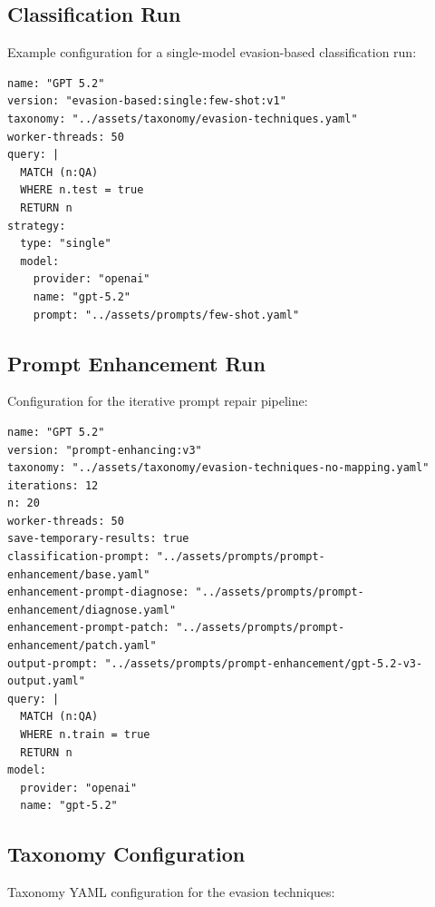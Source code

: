 \documentclass[11pt]{article}
\begin{document}
\subsection{Classification Run}
\label{sec:appendix-classification-config}

Example configuration for a single-model evasion-based classification run:

\begin{lstlisting}[style=yaml]
name: "GPT 5.2"
version: "evasion-based:single:few-shot:v1"
taxonomy: "../assets/taxonomy/evasion-techniques.yaml"
worker-threads: 50
query: |
  MATCH (n:QA)
  WHERE n.test = true
  RETURN n
strategy:
  type: "single"
  model:
    provider: "openai"
    name: "gpt-5.2"
    prompt: "../assets/prompts/few-shot.yaml"
\end{lstlisting}

\subsection{Prompt Enhancement Run}
\label{sec:appendix-prompt-enhancement-config}

Configuration for the iterative prompt repair pipeline:

\begin{lstlisting}[style=yaml]
name: "GPT 5.2"
version: "prompt-enhancing:v3"
taxonomy: "../assets/taxonomy/evasion-techniques-no-mapping.yaml"
iterations: 12
n: 20
worker-threads: 50
save-temporary-results: true
classification-prompt: "../assets/prompts/prompt-enhancement/base.yaml"
enhancement-prompt-diagnose: "../assets/prompts/prompt-enhancement/diagnose.yaml"
enhancement-prompt-patch: "../assets/prompts/prompt-enhancement/patch.yaml"
output-prompt: "../assets/prompts/prompt-enhancement/gpt-5.2-v3-output.yaml"
query: |
  MATCH (n:QA)
  WHERE n.train = true
  RETURN n
model:
  provider: "openai"
  name: "gpt-5.2"
\end{lstlisting}

\subsection{Taxonomy Configuration}
\label{sec:appendix-taxonomy-config}

Taxonomy YAML configuration for the evasion techniques:
\end{document}
